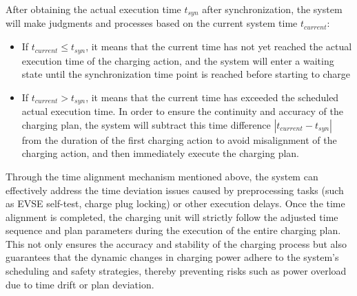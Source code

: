 \documentclass[
english,
ruledheaders=section,%
class=report,%
thesis={type=Report},%
accentcolor=9c,%
custommargins=true,%
marginpar=false,%
parskip=half-,%
fontsize=11pt,%
logofile={img/tuda_logo.pdf}, %
]{tudapub}
\begin{document}
    After obtaining the actual execution time $t_{syn}$ after synchronization, the system will make judgments and processes based on the current system time $t_{current}$:
    \begin{itemize}
        \item If $t_{current} \leq t_{syn}$, it means that the current time has not yet reached the actual execution time of the charging action, and the system will enter a waiting state until the synchronization time point is reached before starting to charge
        \item If $t_{current} > t_{syn}$, it means that the current time has exceeded the scheduled actual execution time. In order to ensure the continuity and accuracy of the charging plan, the system will subtract this time difference $|t_{current} - t_{syn}|$ from the duration of the first charging action to avoid misalignment of the charging action, and then immediately execute the charging plan.
    \end{itemize}



    Through the time alignment mechanism mentioned above, the system can effectively address the time deviation issues caused by preprocessing tasks (such as EVSE self-test, charge plug locking) or other execution delays. Once the time alignment is completed, the charging unit will strictly follow the adjusted time sequence and plan parameters during the execution of the entire charging plan. This not only ensures the accuracy and stability of the charging process but also guarantees that the dynamic changes in charging power adhere to the system’s scheduling and safety strategies, thereby preventing risks such as power overload due to time drift or plan deviation.

\end{document}

